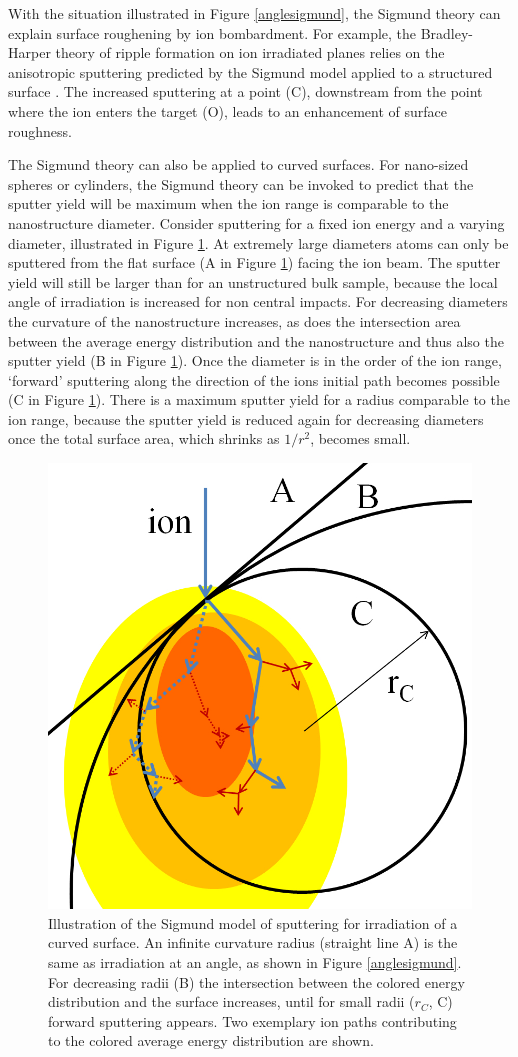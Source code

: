 With the situation illustrated in Figure \ref{anglesigmund}, the Sigmund theory can explain surface roughening by ion bombardment. For example, the Bradley-Harper theory of ripple formation on ion irradiated planes relies on the anisotropic sputtering predicted by the Sigmund model applied to a structured surface \cite{sigmund_mechanism_1973,bradley_theory_1988}. The increased sputtering at a point (C), downstream from the point where the ion enters the target (O), leads to an enhancement of surface roughness.



The Sigmund theory can also be applied to curved surfaces. For nano-sized spheres or cylinders, the Sigmund theory can be invoked to predict that the sputter yield will be maximum when the ion range is comparable to the nanostructure diameter. Consider sputtering for a fixed ion energy and a varying diameter, illustrated in Figure \ref{radiussigmund}. At extremely large diameters atoms can only be sputtered from the flat surface (A in Figure \ref{radiussigmund}) facing the ion beam. The sputter yield will still be larger than for an unstructured bulk sample, because the local angle of irradiation is increased for non central impacts. For decreasing diameters the curvature of the nanostructure increases, as does the intersection area between the average energy distribution and the nanostructure and thus also the sputter yield (B in Figure \ref{radiussigmund}). Once the diameter is in the order of the ion range, `forward' sputtering along the direction of the ions initial path becomes possible (C in Figure \ref{radiussigmund}). There is a maximum sputter yield for a radius comparable to the ion range, because the sputter yield is reduced again for decreasing diameters once the total surface area, which shrinks as $1/r^2$, becomes small. 

\begin{figure}
	\centering
		\includegraphics[width=.45\textwidth]{images/radiussigmund.jpg}
	\caption{Illustration of the Sigmund model of sputtering for irradiation of a curved surface. An infinite curvature radius (straight line A) is the same as irradiation at an angle, as shown in Figure \ref{anglesigmund}. For decreasing radii (B) the intersection between the colored energy distribution and the surface increases, until for small radii ($r_C$, C) forward sputtering appears. Two exemplary ion paths contributing to the colored average energy distribution are shown.}
	\label{radiussigmund}
\end{figure} 


